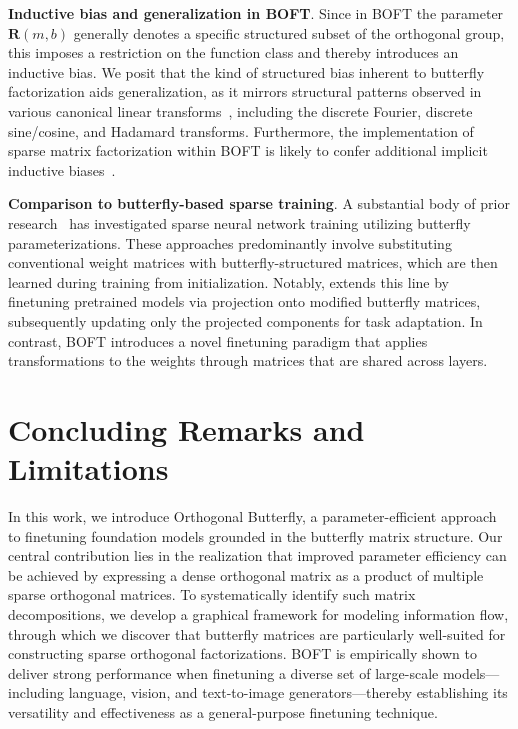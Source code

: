 \textbf{Inductive bias and generalization in BOFT}. Since in BOFT the parameter $\bm{R}(m,b)$ generally denotes a specific structured subset of the orthogonal group, this imposes a restriction on the function class and thereby introduces an inductive bias. We posit that the kind of structured bias inherent to butterfly factorization aids generalization, as it mirrors structural patterns observed in various canonical linear transforms~\cite{dao2019kaleidoscope}, including the discrete Fourier, discrete sine/cosine, and Hadamard transforms. Furthermore, the implementation of sparse matrix factorization within BOFT is likely to confer additional implicit inductive biases~\cite{gunasekar2017implicit,li2018algorithmic,liu2019neural}.

\textbf{Comparison to butterfly-based sparse training}. A substantial body of prior research~\cite{dao2019learning,dao2019kaleidoscope,chen2022pixelated,dao2022monarch} has investigated sparse neural network training utilizing butterfly parameterizations. These approaches predominantly involve substituting conventional weight matrices with butterfly-structured matrices, which are then learned during training from initialization. Notably, \cite{dao2022monarch} extends this line by finetuning pretrained models via projection onto modified butterfly matrices, subsequently updating only the projected components for task adaptation. In contrast, BOFT introduces a novel finetuning paradigm that applies transformations to the weights through matrices that are shared across layers.



\section{Concluding Remarks and Limitations}

In this work, we introduce Orthogonal Butterfly, a parameter-efficient approach to finetuning foundation models grounded in the butterfly matrix structure. Our central contribution lies in the realization that improved parameter efficiency can be achieved by expressing a dense orthogonal matrix as a product of multiple sparse orthogonal matrices. To systematically identify such matrix decompositions, we develop a graphical framework for modeling information flow, through which we discover that butterfly matrices are particularly well-suited for constructing sparse orthogonal factorizations. BOFT is empirically shown to deliver strong performance when finetuning a diverse set of large-scale models—including language, vision, and text-to-image generators—thereby establishing its versatility and effectiveness as a general-purpose finetuning technique.

